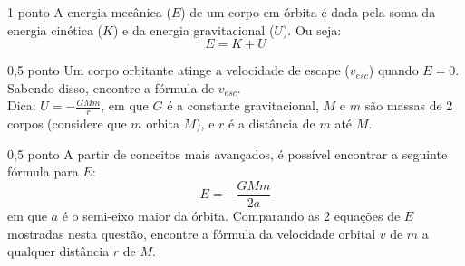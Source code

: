 \documentclass{../lista}
\begin{document}
	\begin{questao}{1 ponto}
		A energia mecânica ($E$) de um corpo em órbita é dada pela soma da energia cinética ($K$) e da energia gravitacional ($U$). Ou seja:
		\begin{equation}
			E=K+U
		\end{equation}

		\begin{pergunta}{0,5 ponto}
			Um corpo orbitante atinge a velocidade de escape ($v_{esc}$) quando $E=0$. Sabendo disso, encontre a fórmula de $v_{esc}$. \\
			Dica: $U = - \frac{GMm}{r}$, em que $G$ é a constante gravitacional, $M$ e $m$ são massas de 2 corpos (considere que $m$ orbita $M$), e $r$ é a distância de $m$ até $M$.


		\end{pergunta}

		\begin{pergunta}{0,5 ponto}
			A partir de conceitos mais avançados, é possível encontrar a seguinte fórmula para $E$:
			\begin{equation}
				E = -\frac{GMm}{2a}
			\end{equation}
			em que $a$ é o semi-eixo maior da órbita. Comparando as 2 equações de $E$ mostradas nesta questão, encontre a fórmula da velocidade orbital $v$ de $m$ a qualquer distância $r$ de $M$.


		\end{pergunta}
	\end{questao}
\end{document}
